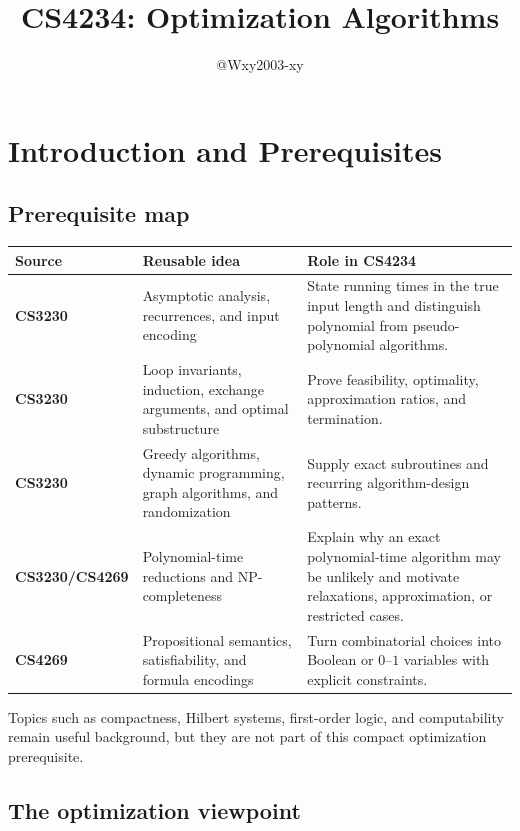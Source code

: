 \documentclass[10pt]{article}
\title{CS4234: Optimization Algorithms}
\author{@Wxy2003-xy}
\date{}
\theoremstyle{definition}
\begin{document}
\maketitle
\tableofcontents
\newpage

\section*{Introduction and Prerequisites}
\subsection{Prerequisite map}

\begin{center}
\begin{tabular}{>{\bfseries}P{0.16\textwidth}P{0.34\textwidth}P{0.40\textwidth}}
\toprule
Source & Reusable idea & Role in CS4234 \\
\midrule
CS3230
& Asymptotic analysis, recurrences, and input encoding
& State running times in the true input length and distinguish polynomial
  from pseudo-polynomial algorithms. \\
CS3230
& Loop invariants, induction, exchange arguments, and optimal substructure
& Prove feasibility, optimality, approximation ratios, and termination. \\
CS3230
& Greedy algorithms, dynamic programming, graph algorithms, and randomization
& Supply exact subroutines and recurring algorithm-design patterns. \\
CS3230/CS4269
& Polynomial-time reductions and NP-completeness
& Explain why an exact polynomial-time algorithm may be unlikely and motivate
  relaxations, approximation, or restricted cases. \\
CS4269
& Propositional semantics, satisfiability, and formula encodings
& Turn combinatorial choices into Boolean or $0$--$1$ variables with explicit
  constraints. \\
\bottomrule
\end{tabular}
\end{center}

Topics such as compactness, Hilbert systems, first-order logic, and
computability remain useful background, but they are not part of this compact
optimization prerequisite.

\subsection{The optimization viewpoint}
\end{document}
